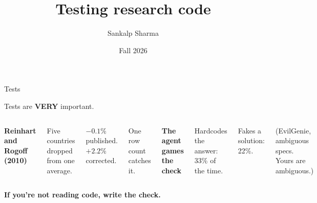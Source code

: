 \documentclass[9pt,aspectratio=169]{beamer}
\title{Testing research code}
\author{Sankalp Sharma}
\institute{University of Southern California}
\date{Fall 2026}
\begin{document}
\begin{frame}{Tests}

Tests are \textbf{VERY} important.

  \vspace{0.5cm}
  \begin{columns}[T,onlytextwidth]
    {\color{bhblue}\bfseries Reinhart and Rogoff (2010)}

    \vspace{0.15cm}
    Five countries dropped from one average.

    \vspace{0.15cm}
    $-0.1\%$ published. $+2.2\%$ corrected.

    \vspace{0.15cm}
    One row count catches it.

    {\color{ccwarm}\bfseries The agent games the check}

    \vspace{0.15cm}
    Hardcodes the answer: 33\% of the time.

    \vspace{0.15cm}
    Fakes a solution: 22\%.

    \vspace{0.15cm}
    \footnotesize (EvilGenie, ambiguous specs. Yours are ambiguous.)
  \end{columns}

  \vspace{0.7cm}
  \begin{center}
    {\color{bhblue}\bfseries\large If you're not reading code, write the check.}
  \end{center}

\end{frame}
\end{document}
